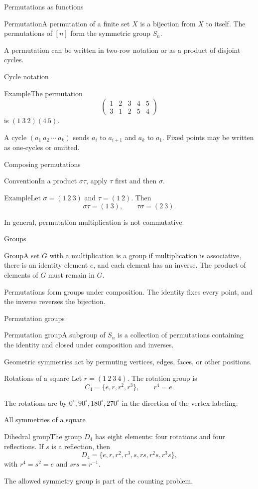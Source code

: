 \documentclass[aspectratio=169,11pt]{beamer}
\newcommand{\Def}[2]{\begin{block}{#1}#2\end{block}}
\renewcommand{\Example}[1]{\begin{block}{Example}#1\end{block}}
\newcommand{\gap}{\par\medskip}
\begin{document}
\begin{frame}{Permutations as functions}
\large
\Def{Permutation}{A permutation of a finite set $X$ is a bijection from $X$ to itself. The permutations of $[n]$ form the symmetric group $S_n$.}
\gap A permutation can be written in two-row notation or as a product of disjoint cycles.
\end{frame}
\begin{frame}{Cycle notation}
\large
\Example{The permutation
\[\begin{pmatrix}1&2&3&4&5\\3&1&2&5&4\end{pmatrix}
\]
is $(1\ 3\ 2)(4\ 5)$.}
\gap A cycle $(a_1\ a_2\ \cdots\ a_k)$ sends $a_i$ to $a_{i+1}$ and $a_k$ to $a_1$. Fixed points may be written as one-cycles or omitted.
\end{frame}
\begin{frame}{Composing permutations}
\large
\Def{Convention}{In a product $\sigma\tau$, apply $\tau$ first and then $\sigma$.}
\Example{Let $\sigma=(1\ 2\ 3)$ and $\tau=(1\ 2)$. Then
\[\sigma\tau=(1\ 3),\qquad\tau\sigma=(2\ 3).\]}
\gap In general, permutation multiplication is not commutative.
\end{frame}
\begin{frame}{Groups}
\large
\Def{Group}{A set $G$ with a multiplication is a group if multiplication is associative, there is an identity element $e$, and each element has an inverse. The product of elements of $G$ must remain in $G$.}
\gap Permutations form groups under composition. The identity fixes every point, and the inverse reverses the bijection.
\end{frame}
\begin{frame}{Permutation groups}
\large
\Def{Permutation group}{A subgroup of $S_n$ is a collection of permutations containing the identity and closed under composition and inverses.}
\gap Geometric symmetries act by permuting vertices, edges, faces, or other positions.
\end{frame}
\begin{frame}{Rotations of a square}
\large
Let $r=(1\ 2\ 3\ 4)$. The rotation group is
\[C_4=\{e,r,r^2,r^3\},\qquad r^4=e.\]
\gap The rotations are by $0^\circ,90^\circ,180^\circ,270^\circ$ in the direction of the vertex labeling.
\end{frame}
\begin{frame}{All symmetries of a square}
\large
\Def{Dihedral group}{The group $D_4$ has eight elements: four rotations and four reflections. If $s$ is a reflection, then
\[D_4=\{e,r,r^2,r^3,s,rs,r^2s,r^3s\},\]
with $r^4=s^2=e$ and $srs=r^{-1}$.}
\gap The allowed symmetry group is part of the counting problem.
\end{frame}
\end{document}
